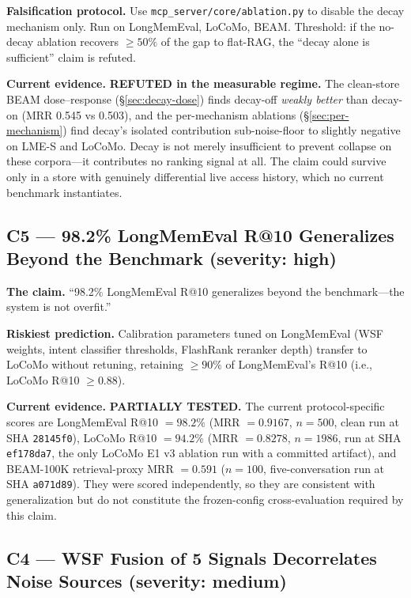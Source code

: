 \documentclass[11pt]{article}
\begin{document}
\textbf{Falsification protocol.}  Use
\texttt{mcp\_server/core/ablation.py} to disable the decay
mechanism only.  Run on LongMemEval, LoCoMo, BEAM.  Threshold: if
the no-decay ablation recovers $\ge 50\%$ of the gap to flat-RAG,
the ``decay alone is sufficient'' claim is refuted.

\textbf{Current evidence.} \textbf{REFUTED in the measurable
regime.}  The clean-store BEAM dose--response
(\S\ref{sec:decay-dose}) finds decay-off \emph{weakly better} than
decay-on (MRR 0.545 vs 0.503), and the per-mechanism ablations
(\S\ref{sec:per-mechanism}) find decay's isolated contribution
sub-noise-floor to slightly negative on LME-S and LoCoMo.  Decay is
not merely insufficient to prevent collapse on these corpora---it
contributes no ranking signal at all.  The claim could survive only
in a store with genuinely differential live access history, which
no current benchmark instantiates.

\subsection{C5 --- 98.2\% LongMemEval R@10 Generalizes Beyond the Benchmark (severity: high)}
\label{app:popper-c5}

\textbf{The claim.} ``98.2\% LongMemEval R@10 generalizes beyond
the benchmark---the system is not overfit.''

\textbf{Riskiest prediction.}  Calibration parameters tuned on
LongMemEval (WSF weights, intent classifier thresholds, FlashRank
reranker depth) transfer to LoCoMo without retuning, retaining
$\ge 90\%$ of LongMemEval's R@10 (i.e., LoCoMo R@10 $\ge 0.88$).

\textbf{Current evidence.} \textbf{PARTIALLY TESTED.}  The current
protocol-specific scores are LongMemEval R@10 $=98.2\%$ (MRR $=0.9167$,
$n{=}500$, clean run at SHA \texttt{28145f0}), LoCoMo R@10 $=94.2\%$
(MRR $=0.8278$, $n{=}1986$, run at SHA
\texttt{ef178da7}, the only LoCoMo E1 v3 ablation run with a committed
artifact), and BEAM-100K retrieval-proxy MRR $=0.591$
($n{=}100$, five-conversation run at SHA \texttt{a071d89}).  They were
scored independently, so they are consistent with generalization but
do not constitute the frozen-config cross-evaluation required by this claim.

\subsection{C4 --- WSF Fusion of 5 Signals Decorrelates Noise Sources (severity: medium)}
\label{app:popper-c4}
\end{document}
